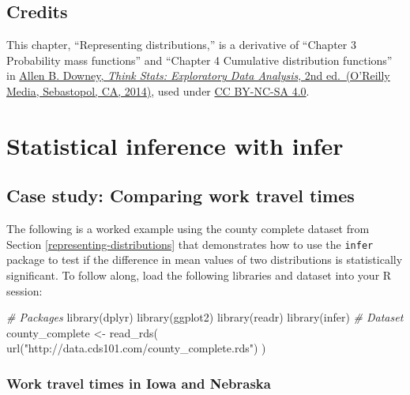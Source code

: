 \documentclass[
]{book}
\newenvironment{Shaded}{\begin{snugshade}}{\end{snugshade}}
\newcommand{\CommentTok}[1]{\textcolor[rgb]{0.56,0.35,0.01}{\textit{#1}}}
\newcommand{\FunctionTok}[1]{\textcolor[rgb]{0.00,0.00,0.00}{#1}}
\newcommand{\NormalTok}[1]{#1}
\newcommand{\OtherTok}[1]{\textcolor[rgb]{0.56,0.35,0.01}{#1}}
\newcommand{\StringTok}[1]{\textcolor[rgb]{0.31,0.60,0.02}{#1}}
\begin{document}
\hypertarget{credits}{%
\section{Credits}\label{credits}}

This chapter, ``Representing distributions,'' is a derivative of ``Chapter 3 Probability mass functions'' and ``Chapter 4 Cumulative distribution functions'' in \href{http://a.co/grOJGrv}{Allen B. Downey, \emph{Think Stats: Exploratory Data Analysis}, 2nd ed.~(O'Reilly Media, Sebastopol, CA, 2014)}, used under \href{http://creativecommons.org/licenses/by-nc-sa/4.0/}{CC BY-NC-SA 4.0}.

\hypertarget{statistical-inference-with-infer}{%
\chapter{Statistical inference with infer}\label{statistical-inference-with-infer}}

\hypertarget{case-study-comparing-work-travel-times}{%
\section{Case study: Comparing work travel times}\label{case-study-comparing-work-travel-times}}

The following is a worked example using the county complete dataset from Section \ref{representing-distributions} that demonstrates how to use the \texttt{infer} package to test if the difference in mean values of two distributions is statistically significant.
To follow along, load the following libraries and dataset into your R session:

\begin{Shaded}
\begin{Highlighting}[]
\CommentTok{\# Packages}
\FunctionTok{library}\NormalTok{(dplyr)}
\FunctionTok{library}\NormalTok{(ggplot2)}
\FunctionTok{library}\NormalTok{(readr)}
\FunctionTok{library}\NormalTok{(infer)}
\CommentTok{\# Dataset}
\NormalTok{county\_complete }\OtherTok{\textless{}{-}} \FunctionTok{read\_rds}\NormalTok{(}
  \FunctionTok{url}\NormalTok{(}\StringTok{"http://data.cds101.com/county\_complete.rds"}\NormalTok{)}
\NormalTok{)}
\end{Highlighting}
\end{Shaded}

\hypertarget{work-travel-times-in-iowa-and-nebraska}{%
\subsection{Work travel times in Iowa and Nebraska}\label{work-travel-times-in-iowa-and-nebraska}}
\end{document}
